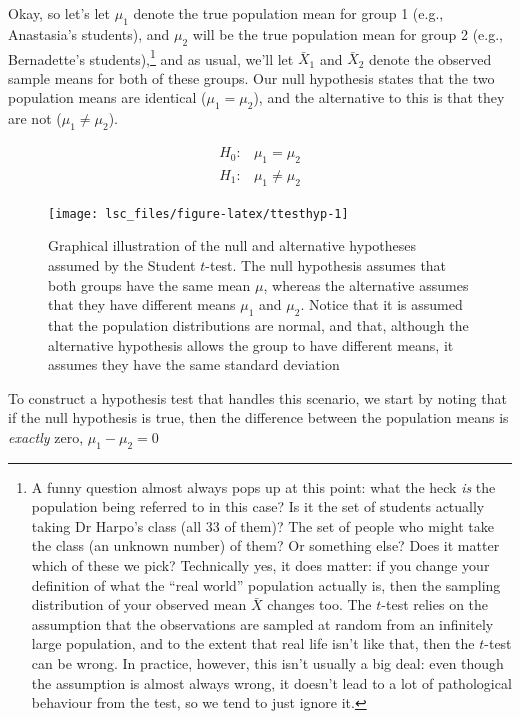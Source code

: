 \documentclass[
]{book}
\theoremstyle{definition}
\theoremstyle{definition}
\theoremstyle{definition}
\theoremstyle{definition}
\theoremstyle{remark}
\begin{document}
Okay, so let's let \(\mu_1\) denote the true population mean for group 1 (e.g., Anastasia's students), and \(\mu_2\) will be the true population mean for group 2 (e.g., Bernadette's students),\footnote{A funny question almost always pops up at this point: what the heck \emph{is} the population being referred to in this case? Is it the set of students actually taking Dr Harpo's class (all 33 of them)? The set of people who might take the class (an unknown number) of them? Or something else? Does it matter which of these we pick? Technically yes, it does matter: if you change your definition of what the ``real world'' population actually is, then the sampling distribution of your observed mean \(\bar{X}\) changes too. The \(t\)-test relies on the assumption that the observations are sampled at random from an infinitely large population, and to the extent that real life isn't like that, then the \(t\)-test can be wrong. In practice, however, this isn't usually a big deal: even though the assumption is almost always wrong, it doesn't lead to a lot of pathological behaviour from the test, so we tend to just ignore it.} and as usual, we'll let \(\bar{X}_1\) and \(\bar{X}_2\) denote the observed sample means for both of these groups. Our null hypothesis states that the two population means are identical (\(\mu_1 = \mu_2\)), and the alternative to this is that they are not (\(\mu_1 \neq \mu_2\)).

\[
\begin{array}{ll}
H_0: & \mu_1 = \mu_2  \\
H_1: & \mu_1 \neq \mu_2
\end{array}
\]

\begin{figure}

{\centering \texttt{[image: lsc\_files/figure-latex/ttesthyp-1]} 

}

\caption{Graphical illustration of the null and alternative hypotheses assumed by the Student $t$-test. The null hypothesis assumes that both groups have the same mean $\mu$, whereas the alternative assumes that they have different means $\mu_1$ and $\mu_2$. Notice that it is assumed that the population distributions are normal, and that, although the alternative hypothesis allows the group to have different means, it assumes they have the same standard deviation}\label{fig:ttesthyp}
\end{figure}

To construct a hypothesis test that handles this scenario, we start by noting that if the null hypothesis is true, then the difference between the population means is \emph{exactly} zero,
\(\mu_1 - \mu_2 = 0\)
\end{document}
